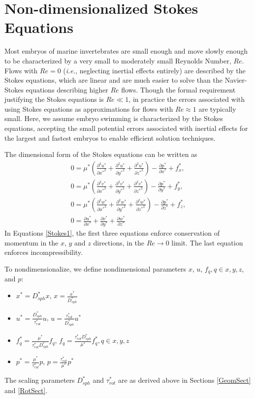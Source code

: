 \documentclass[10pt,a4paper]{article}
\def\non{\nonumber}
\def\p{\partial}
\begin{document}
\section{Non-dimensionalized Stokes Equations}\label{NDStokesSect}
Most embryos of marine invertebrates are small enough and move slowly enough to be characterized by a very small to moderately small Reynolds Number, $Re$. 
Flows with $Re = 0$ (\textit{i.e.}, neglecting inertial effects entirely) are described by the Stokes equations, which are linear and are much easier to solve than the Navier-Stokes equations describing higher $Re$ flows.
Though the formal requirement justifying the Stokes equations is $Re \ll 1$, in practice the errors associated with using Stokes equations as approximations for flows with $Re \approx 1$ are typically small.
Here, we assume embryo swimming is characterized by the Stokes equations, accepting the small potential errors associated with inertial effects for the largest and fastest embryos to enable efficient solution techniques.

The dimensional form of the Stokes equations can be written as
\begin{eqnarray}\label{Stokes1}
	0 = \mu^* \left( \frac{\p^2 u^*}{\p {x^*}^2}+\frac{\p^2 u^*}{\p {y^*}^2}+\frac{\p^2 u^*}{\p {z^*}^2} \right) - \frac{\p p^*}{\p {x^*}} + f_x^*, \non \\
	0 = \mu^* \left( \frac{\p^2 v^*}{\p {x^*}^2}+\frac{\p^2 v^*}{\p {y^*}^2}+\frac{\p^2 v^*}{\p {z^*}^2} \right) - \frac{\p p^*}{\p {y^*}} + f_y^*, \non \\
	0 = \mu^* \left( \frac{\p^2 w^*}{\p {x^*}^2}+\frac{\p^2 w^*}{\p {y^*}^2}+\frac{\p^2 w^*}{\p {z^*}^2} \right) - \frac{\p p^*}{\p {z^*}} + f_z^*, \non \\
	0 =  \frac{\p u^*}{\p {x^*}}+\frac{\p v^*}{\p {y^*}}+\frac{\p w^*}{\p {z^*}} 
\end{eqnarray}
In Equations \ref{Stokes1}, the first three equations enforce conservation of momentum in the $x$, $y$ and $z$ directions, in the $Re \rightarrow 0$ limit.
The last equation enforces incompressibility.

To nondimensionalize, we define nondimensional parameters $x$, $u$, $f_q, q \in x, y, z$,  and $p$:
\begin{itemize}
	\item $x^* = D_{sph}^* x$, $x = \frac{x^*}{D_{sph}^*}$
	\item $u^* = \frac{D_{sph}^*}{\tau^*_{rot}} u$, $u = \frac{\tau^*_{rot}}{D_{sph}^*} u^*$
	\item $f_q^* = \frac{\mu^*}{\tau^*_{rot} D_{sph}^*} f_q$, $f_q = \frac{\tau^*_{rot} D_{sph}^*}{\mu^*} f_q^*, q \in x, y, z$
	\item $p^* = \frac{\mu^*}{\tau^*_{rot}} p$, $p = \frac{\tau^*_{rot}}{\mu^*} p^*$
\end{itemize}
The scaling parameters $D_{sph}^*$ and $\tau^*_{rot}$ are as derived above in Sections \ref{GeomSect} and \ref{RotSect}.
\end{document}
